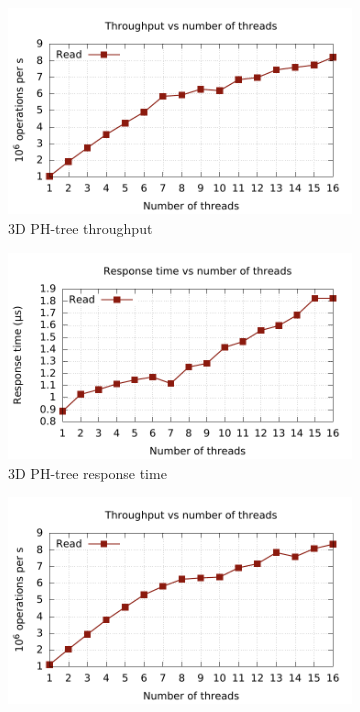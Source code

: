 \documentclass[11pt,a4paper]{globis-book}
\begin{document}
\begin{figure}
    \centering
    \begin{subfigure}[b]{0.5\linewidth}
        \includegraphics[scale=0.5]{images/plots/read3d-tp}
        \caption{3D PH-tree throughput}
    \end{subfigure}%
    \begin{subfigure}[b]{0.5\linewidth}
        \includegraphics[scale=0.5]{images/plots/read3d-rt}
        \caption{3D PH-tree response time}
    \end{subfigure}
    \centering
    \begin{subfigure}[b]{0.5\linewidth}
        \includegraphics[scale=0.5]{images/plots/read6d-tp}

\end{subfigure}
\end{figure}
\end{document}

